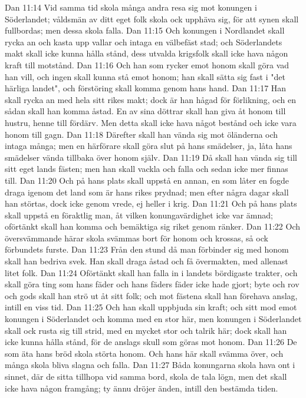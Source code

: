 Dan 11:14  Vid samma tid skola många andra resa sig mot konungen i Söderlandet; våldsmän av ditt eget folk skola ock upphäva sig, för att synen skall fullbordas; men dessa skola falla.
Dan 11:15  Och konungen i Nordlandet skall rycka an och kasta upp vallar och intaga en välbefäst stad; och Söderlandets makt skall icke kunna hålla stånd, dess utvalda krigsfolk skall icke hava någon kraft till motstånd.
Dan 11:16  Och han som rycker emot honom skall göra vad han vill, och ingen skall kunna stå emot honom; han skall sätta sig fast i "det härliga landet", och förstöring skall komma genom hans hand.
Dan 11:17  Han skall rycka an med hela sitt rikes makt; dock är han hågad för förlikning, och en sådan skall han komma åstad. En av sina döttrar skall han giva åt honom till hustru, henne till fördärv. Men detta skall icke hava något bestånd och icke vara honom till gagn.
Dan 11:18  Därefter skall han vända sig mot öländerna och intaga många; men en härförare skall göra slut på hans smädelser, ja, låta hans smädelser vända tillbaka över honom själv.
Dan 11:19  Då skall han vända sig till sitt eget lands fästen; men han skall vackla och falla och sedan icke mer finnas till.
Dan 11:20  Och på hans plats skall uppstå en annan, en som låter en fogde draga igenom det land som är hans rikes prydnad; men efter några dagar skall han störtas, dock icke genom vrede, ej heller i krig.
Dan 11:21  Och på hans plats skall uppstå en föraktlig man, åt vilken konungavärdighet icke var ämnad; oförtänkt skall han komma och bemäktiga sig riket genom ränker.
Dan 11:22  Och översvämmande härar skola svämmas bort för honom och krossas, så ock förbundets furste.
Dan 11:23  Från den stund då man förbinder sig med honom skall han bedriva svek. Han skall draga åstad och få övermakten, med allenast litet folk.
Dan 11:24  Oförtänkt skall han falla in i landets bördigaste trakter, och skall göra ting som hans fäder och hans fäders fäder icke hade gjort; byte och rov och gods skall han strö ut åt sitt folk; och mot fästena skall han förehava anslag, intill en viss tid.
Dan 11:25  Och han skall uppbjuda sin kraft; och sitt mod emot konungen i Söderlandet och komma med en stor här, men konungen i Söderlandet skall ock rusta sig till strid, med en mycket stor och talrik här; dock skall han icke kunna hålla stånd, för de anslags skull som göras mot honom.
Dan 11:26  De som äta hans bröd skola störta honom. Och hans här skall svämma över, och många skola bliva slagna och falla.
Dan 11:27  Båda konungarna skola hava ont i sinnet, där de sitta tillhopa vid samma bord, skola de tala lögn, men det skall icke hava någon framgång; ty ännu dröjer änden, intill den bestämda tiden.
